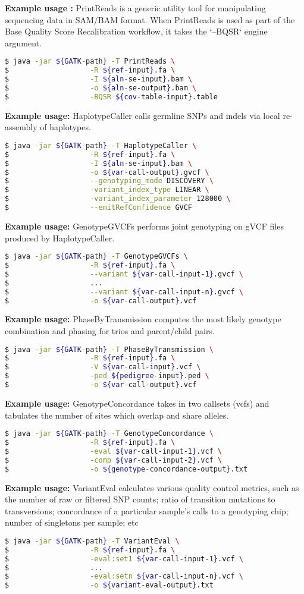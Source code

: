 \documentclass[8pt]{article}
\begin{document}
\textbf{Example usage :} PrintReads is a generic utility tool for manipulating sequencing data in SAM/BAM format. When PrintReads is used as part of the Base Quality Score Recalibration workflow, it takes the `--BQSR` engine argument.
\begin{lstlisting}[language=bash]
$ java -jar ${GATK-path} -T PrintReads \
$					-R ${ref-input}.fa \
$					-I ${aln-se-input}.bam \
$					-o ${aln-se-output}.bam \
$					-BQSR ${cov-table-input}.table
\end{lstlisting}
\textbf{Example usage:} HaplotypeCaller calls germline SNPs and indels via local re-assembly of haplotypes.
\begin{lstlisting}[language=bash]
$ java -jar ${GATK-path} -T HaplotypeCaller \
$					-R ${ref-input}.fa \
$					-I ${aln-se-input}.bam \
$					-o ${var-call-output}.gvcf \
$					--genotyping_mode DISCOVERY \
$					-variant_index_type LINEAR \
$					-variant_index_parameter 128000 \
$					--emitRefConfidence GVCF
\end{lstlisting}
\textbf{Example usage:} GenotypeGVCFs performs joint genotyping on gVCF files produced by HaplotypeCaller.
\begin{lstlisting}[language=bash]
$ java -jar ${GATK-path} -T GenotypeGVCFs \
$					-R ${ref-input}.fa \
$					--variant ${var-call-input-1}.gvcf \
$					...
$					--variant ${var-call-input-n}.gvcf \
$					-o ${var-call-output}.vcf
\end{lstlisting}

\newpage

\textbf{Example usage:} PhaseByTransmission computes the most likely genotype combination and phasing for trios and parent/child pairs.
\begin{lstlisting}[language=bash]
$ java -jar ${GATK-path} -T PhaseByTransmission \
$					-R ${ref-input}.fa \
$					-V ${var-call-input}.vcf \
$					-ped ${pedigree-input}.ped \
$					-o ${var-call-output}.vcf
\end{lstlisting}
\textbf{Example usage:} GenotypeConcordance takes in two callsets (vcfs) and tabulates the number of sites which overlap and share alleles.
\begin{lstlisting}[language=bash]
$ java -jar ${GATK-path} -T GenotypeConcordance \
$					-R ${ref-input}.fa \
$					-eval ${var-call-input-1}.vcf \
$					-comp ${var-call-input-2}.vcf \
$					-o ${genotype-concordance-output}.txt
\end{lstlisting}
\textbf{Example usage:} VariantEval calculates various quality control metrics, such as the number of raw or filtered SNP counts; ratio of transition mutations to transversions; concordance of a particular sample's calls to a genotyping chip; number of singletons per sample; etc
\begin{lstlisting}[language=bash]
$ java -jar ${GATK-path} -T VariantEval \
$					-R ${ref-input}.fa \
$					-eval:set1 ${var-call-input-1}.vcf \
$					...
$					-eval:setn ${var-call-input-n}.vcf \
$					-o ${variant-eval-output}.txt
\end{lstlisting}
\end{document}
